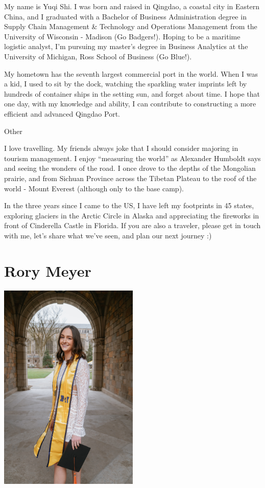 \documentclass[
]{book}
\begin{document}
My name is Yuqi Shi. I was born and raised in Qingdao, a coastal city in Eastern China, and I graduated with a Bachelor of Business Administration degree in Supply Chain Management \& Technology and Operations Management from the University of Wisconsin - Madison (Go Badgers!). Hoping to be a maritime logistic analyst, I'm pursuing my master's degree in Business Analytics at the University of Michigan, Ross School of Business (Go Blue!).

My hometown has the seventh largest commercial port in the world. When I was a kid, I used to sit by the dock, watching the sparkling water imprints left by hundreds of container ships in the setting sun, and forget about time. I hope that one day, with my knowledge and ability, I can contribute to constructing a more efficient and advanced Qingdao Port.

Other

I love travelling. My friends always joke that I should consider majoring in tourism management. I enjoy ``measuring the world'' as Alexander Humboldt says and seeing the wonders of the road. I once drove to the depths of the Mongolian prairie, and from Sichuan Province across the Tibetan Plateau to the roof of the world - Mount Everest (although only to the base camp).

In the three years since I came to the US, I have left my footprints in 45 states, exploring glaciers in the Arctic Circle in Alaska and appreciating the fireworks in front of Cinderella Castle in Florida. If you are also a traveler, please get in touch with me, let's share what we've seen, and plan our next journey :)

\hypertarget{rory-meyer}{%
\section{Rory Meyer}\label{rory-meyer}}

\includegraphics[width=0.5\textwidth,height=\textheight]{gradphoto.jpg}
\end{document}

